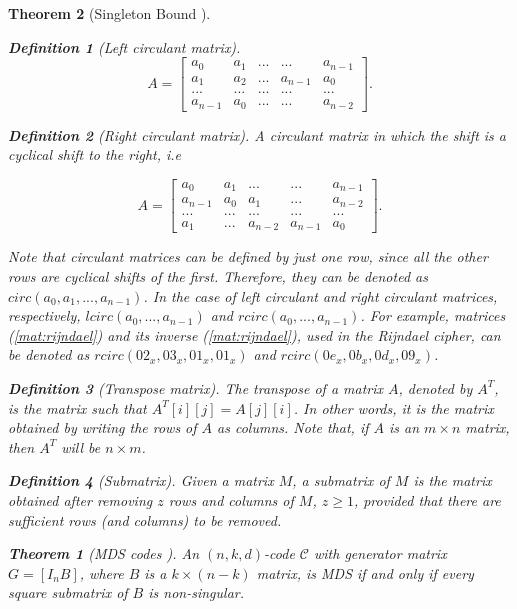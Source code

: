 \documentclass{report}
\newtheorem{definition}{Definition}{\bfseries}{\itshape}
\newtheorem{theorem}{Theorem}{\bfseries}{\itshape}
\begin{document}
\begin{theorem}[Singleton Bound \cite{SloaneBook}]
\begin{definition}[Left circulant matrix]
$$
A = 
\begin{bmatrix}
a_0 & a_1 & ... & ... & a_{n-1}\\
a_1 & a_2 & ... & a_{n-1} & a_0\\
... & ... & ... & ... & ...\\
a_{n-1} & a_0 & ... & ... & a_{n-2}
\end{bmatrix}.
$$
\end{definition}

\begin{definition}[Right circulant matrix]
A circulant matrix in which the shift is a cyclical shift to the right, i.e

$$
A = 
\begin{bmatrix}
a_0 & a_1 & ... & ... & a_{n-1}\\
a_{n-1} & a_0 & a_1 & ... & a_{n-2}\\
... & ... & ... & ... & ...\\
a_1 & ... & a_{n-2} & a_{n-1} & a_0
\end{bmatrix}.
$$
\end{definition}

Note that circulant matrices can be defined by just one row, since all the other rows are cyclical shifts of the first. Therefore, they can be denoted as $circ(a_0, a_1, ..., a_{n-1})$. In the case of left circulant and right circulant matrices, respectively, $lcirc(a_0, ..., a_{n-1})$ and $rcirc(a_0, ..., a_{n-1})$. For example, matrices (\ref{mat:rijndael}) and its inverse (\ref{mat:rijndael}), used in the Rijndael cipher, can be denoted as $rcirc(02_x, 03_x, 01_x, 01_x)$ and $rcirc(0e_x, 0b_x, 0d_x, 09_x)$.

\begin{definition}[Transpose matrix]
The transpose of a matrix $A$, denoted by $A^T$, is the matrix such that $A^T[i][j] = A[j][i]$. In other words, it is the matrix obtained by writing the rows of $A$ as columns. Note that, if $A$ is an $m \times n$ matrix, then $A^T$ will be $n \times m$.
\end{definition}

\begin{definition}[Submatrix]
Given a matrix $M$, a submatrix of $M$ is the matrix obtained after removing $z$ rows and columns of $M$, $z \geq 1$, provided that there are sufficient rows (and columns) to be removed.
\end{definition}

\begin{theorem}[MDS codes \cite{SloaneBook}]\label{teo:mds}
An $(n, k, d)$-code $\mathcal{C}$ with generator matrix $G = [I_nB]$, where $B$ is a $k \times (n - k)$ matrix, is MDS if and only if every square submatrix of $B$ is non-singular.
\end{theorem}


\end{theorem}
\end{document}
